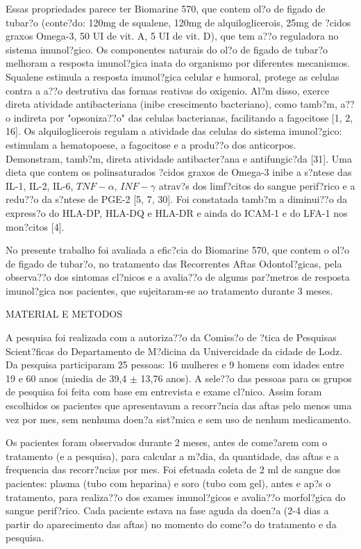 \documentclass[12pt]{article}
\begin{document}
 Essas propriedades parece ter Biomarine 570, que contem ol?o de figado de
tubar?o (conte?do: 120mg de squalene, 120mg de alquiloglicerois, 25mg de ?cidos
graxos Omega-3, 50 UI de vit. A, 5 UI de vit. D), que tem a??o reguladora no
sistema imunol?gico. Os componentes naturais do ol?o de figado de tubar?o
melhoram a resposta imunol?gica inata do organismo por diferentes
mecanismos. Squalene estimula a resposta imunol?gica celular e humoral, protege
as celulas contra a a??o destrutiva das formas reativas do oxigenio. Al?m
disso, exerce direta atividade antibacteriana (inibe crescimento bacteriano),
como tamb?m, a??o indireta por "opsoniza??o" das celulas bacterianas,
facilitando a fagocitose [1, 2, 16].  Os alquiloglicerois regulam a atividade
das celulas do sistema imunol?gico: estimulam a hematopoese, a fagocitose e a
produ??o dos anticorpos. Demonstram, tamb?m, direta atividade antibacter?ana e
antifungic?da [31]. Uma dieta que contem os polinsaturados ?cidos graxos de
Omega-3 inibe a s?ntese das IL-1, IL-2, IL-6, $TNF-\alpha$, $INF-\gamma$
atrav?s dos limf?citos do sangue perif?rico e a redu??o da s?ntese de PGE-2
[5, 7, 30]. Foi constatada tamb?m a diminui??o da express?o do HLA-DP, HLA-DQ e
HLA-DR e ainda do ICAM-1 e do LFA-1 nos mon?citos [4].

 No presente trabalho foi avaliada a efic?cia do Biomarine 570, que contem o
ol?o de figado de tubar?o, no tratamento das Recorrentes Aftas Odontol?gicas,
pela observa??o dos sintomas cl?nicos e a avalia??o de algums par?metros de
resposta imunol?gica nos pacientes, que sujeitaram-se ao tratamento durante 3
meses.

\begin{center}
\large{MATERIAL E METODOS}
\end{center}

 A pesquisa foi realizada com a autoriza??o da Comiss?o de ?tica de Pesquisas
Scient?ficas do Departamento de M?dicina da Univercidade da cidade de Lodz. Da
pesquisa participaram 25 pessoas: 16 mulheres e 9 homens com idades entre 19 e
60 anos (miedia de 39,4 $\pm$ 13,76 anos). A sele??o das pessoas para os grupos
de pesquisa foi feita com base em entrevista e exame cl?nico. Assim foram
escolhidos os pacientes que apresentavam a recorr?ncia das aftas pelo menos uma
vez por mes, sem nenhuma doen?a sist?mica e sem uso de nenhum medicamento.

 Os pacientes foram observados durante 2 meses, antes de come?arem com o
tratamento (e a pesquisa), para calcular a m?dia, da quantidade, das aftas e a
frequencia das recorr?ncias por mes. Foi efetuada coleta de 2 ml de sangue dos
pacientes: plasma (tubo com heparina) e soro (tubo com gel), antes e ap?s o
tratamento, para realiza??o dos exames imunol?gicos e avalia??o morfol?gica do
sangue perif?rico. Cada paciente estava na fase aguda da doen?a (2-4 dias a
partir do aparecimento das aftas) no momento do come?o do tratamento e da
pesquisa.
\end{document}
